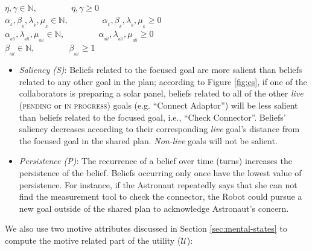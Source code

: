 \documentclass[12pt]{report}
\begin{document}
\begin{center} 
    $\eta, \gamma \in \mathbb{N}, \qquad\qquad \eta, \gamma \geq 0$\\
    $\alpha_{_k}, \beta_{_k}, \lambda_{_k}, \mu_{_k} \in \mathbb{N},
    \qquad\qquad \alpha_{_k}, \beta_{_k}, \lambda_{_k}, \mu_{_k} \geq 0$\\
    $\alpha_{_{all}}, \lambda_{_{all}}, \mu_{_{all}} \in \mathbb{N},
    \qquad\qquad \alpha_{_{all}}, \lambda_{_{all}}, \mu_{_{all}} \geq 0$\\
    $\beta_{_{all}} \in \mathbb{N}, \qquad\qquad \beta_{_{all}} \geq 1$
\end{center}

\begin{itemize}
  \setlength\itemsep{1mm}
  \item \textit{Saliency (S)}: Beliefs related to the focused goal are more
  salient than beliefs related to any other goal in the plan; according to
  Figure \ref{fig:cs}, if one of the collaborators is preparing a solar panel,
  beliefs related to all of the other \textit{live} (\textsc{pending} or
  \textsc{in progress}) goals (e.g. ``Connect Adaptor'') will be less salient
  than beliefs related to the focused goal, i.e., ``Check Connector''. Beliefs'
  saliency decreases according to their corresponding \textit{live} goal's
  distance from the focused goal in the shared plan. \textit{Non-live} goals
  will not be salient.
  \item \textit{Persistence (P)}: The recurrence of a belief over time (turns)
  increases the persistence of the belief. Beliefs occurring only once have the
  lowest value of persistence. For instance, if the Astronaut repeatedly says
  that she can not find the measurement tool to check the connector, the Robot
  could pursue a new goal outside of the shared plan to acknowledge Astronaut's
  concern.
\end{itemize}

\noindent We also use two motive attributes discussed in Section
\ref{sec:mental-states} to compute the motive related part of the utility
($\mathcal{U}$):
\end{document}
